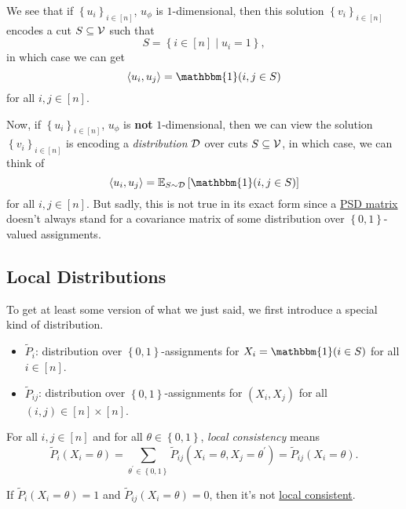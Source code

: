 We see that if \(\left\{ u_i \right\} _{i\in [n]}\), \(u_\phi \) is \(1\)-dimensional, then this solution \(\left\{ v_i \right\} _{i\in [n]}\) encodes a cut \(S \subseteq \mathcal{\MakeUppercase{v}} \) such that
\[
	S = \left\{ i\in [n] \mid u_i = 1 \right\},
\]
in which case we can get
\[
	\left\langle u_i, u_j \right\rangle = \mathbbm{1}(i, j\in S)
\]
for all \(i, j\in [n]\).

Now, if \(\left\{ u_i \right\} _{i\in [n]}\), \(u_\phi \) is \textbf{not} \(1\)-dimensional, then we can view the solution \(\left\{ v_i \right\} _{i\in [n]}\) is encoding a \emph{distribution} \(\mathcal{\MakeUppercase{d}} \) over cuts \(S \subseteq \mathcal{\MakeUppercase{v}} \), in which case, we can think of
\[
	\left\langle u_i, u_j \right\rangle = \mathbb{E}_{S\sim \mathcal{\MakeUppercase{D}} }\left[ \mathbbm{1}(i, j\in S)\right]
\]
for all \(i, j\in [n]\). But sadly, this is not true in its exact form since a \hyperref[def:PSD]{PSD matrix} doesn't always stand for a covariance matrix of some distribution over \(\left\{ 0, 1 \right\} \)-valued assignments.

\subsection{Local Distributions}
To get at least some version of what we just said, we first introduce a special kind of distribution.

\begin{itemize}
	\item \(\widetilde{P} _i\): distribution over \(\left\{ 0, 1 \right\} \)-assignments for \(X_i= \mathbbm{1}(i\in S) \) for all \(i\in [n]\).
	\item \(\widetilde{P} _{ij}\): distribution over \(\left\{ 0, 1 \right\} \)-assignments for \((X_i, X_j)\) for all \((i, j)\in [n]\times [n]\).
\end{itemize}

\begin{definition}\label{def:local-consistency}
	For all \(i, j\in [n]\) and for all \(\theta \in \left\{ 0, 1 \right\} \), \emph{local consistency} means
	\[
		\widetilde{P} _i(X_i = \theta ) = \sum_{\theta ^\prime \in \left\{ 0, 1 \right\} } \widetilde{P} _{ij}(X_i=\theta , X_j = \theta ^\prime )= \widetilde{P} _{ij}(X_i = \theta ).
	\]
\end{definition}

\begin{eg}
	If \(\widetilde{P} _i (X_i = \theta ) = 1\) and \(\widetilde{P} _{ij}(X_i = \theta ) = 0\), then it's not \hyperref[def:local-consistency]{local consistent}.
\end{eg}

